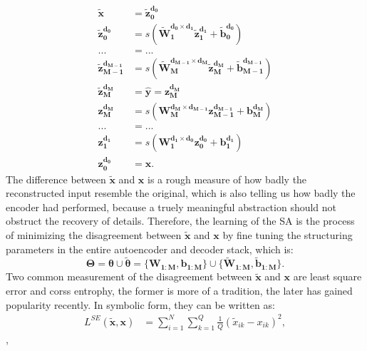 \begin{equation} \label{eq:SDA}
\begin{split}
  \boldsymbol{\tilde{x}}                 &= \boldsymbol{\tilde{z}_{0  }^{d_{0  }}} \\
  \boldsymbol{\tilde{z}_{0  }^{d_{0  }}} &= s(\boldsymbol{\tilde{W}_{1  }^{d_{0  } \times d_{1  }} \tilde{z}_{1  }^{d_{1  }}}+\boldsymbol{\tilde{b}_{0  }^{d_{0  }}}) \\
  ... &= ... \\
  \boldsymbol{\tilde{z}_{M-1}^{d_{M-1}}} &= s(\boldsymbol{\tilde{W}_{M  }^{d_{M-1} \times d_{M  }} \tilde{z}_{M  }^{d_{M  }}}+\boldsymbol{\tilde{b}_{M-1}^{d_{M-1}}}) \\
  \boldsymbol{\tilde{z}_{M  }^{d_{M  }}} &= \boldsymbol{\hat{y}} = \boldsymbol{z_{M  }^{d_{M  }}} \\
  \boldsymbol{z_{M  }^{d_{M  }}}         &= s(\boldsymbol{W_{M  }^{d_{M  } \times d_{M-1}} z_{M-1}^{d_{M-1}}}+\boldsymbol{b_{M  }^{d_{M  }}}) \\
  ... &= ... \\
  \boldsymbol{z_{1  }^{d_{1  }}}         &= s(\boldsymbol{W_{1  }^{d_{1  } \times d_{0  }} z_{0  }^{d_{0  }}}+\boldsymbol{b_{1  }^{d_{1  }}}) \\
  \boldsymbol{z_{0  }^{d_{0  }}}         &= \boldsymbol{x}.
\end{split}
\end{equation}
The difference between $\boldsymbol{\tilde{x}}$ and $\boldsymbol{x}$ is a rough measure of how badly the reconstructed input resemble the original, which is also telling us how badly the encoder had performed, because a truely meaningful abstraction should not obstruct the recovery of details. Therefore, the learning of the SA is the process of minimizing the disagreement between $\boldsymbol{\tilde{x}}$ and $\boldsymbol{x}$ by fine tuning the structuring parameters in the entire autoencoder and decoder stack, which is:
\[
\boldsymbol{\Theta} = \boldsymbol{\theta} \cup \boldsymbol{\tilde{\theta}}=\{\boldsymbol{W_{1:M}},\boldsymbol{b_{1:M}}\} \cup \{\boldsymbol{\tilde{W}_{1:M}}, \boldsymbol{\tilde{b}_{1:M}}\}.
\]
Two common measurement of the disagreement between $\boldsymbol{\tilde{x}}$ and $\boldsymbol{x}$ are least square error and corss entrophy, the former is more of a tradition, the later has gained popularity recently. In symbolic form, they can be written as:
\begin{equation} \label{eq:SE}
\begin{split}
  L^{SE}(\boldsymbol{\tilde{x}},\boldsymbol{x}) &= \sum_{i=1}^N\sum_{k=1}^Q\frac{1}{Q}(\tilde{x}_{ik}-x_{ik})^2,
\end{split}
\end{equation},
